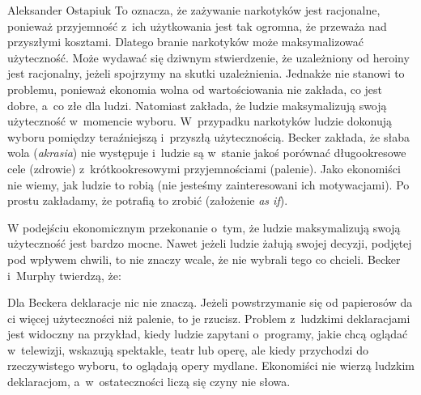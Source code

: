 \begin{artplenv}{Aleksander Ostapiuk}
To oznacza, że zażywanie narkotyków jest racjonalne, ponieważ przyjemność z~ich użytkowania jest tak ogromna, że
przeważa nad przyszłymi kosztami. Dlatego branie narkotyków może maksymalizować użyteczność. Może wydawać się dziwnym
stwierdzenie, że uzależniony od heroiny jest racjonalny, jeżeli spojrzymy na skutki uzależnienia. Jednakże nie stanowi
to problemu, ponieważ ekonomia wolna od wartościowania nie zakłada, co jest dobre, a~co złe dla ludzi. Natomiast
zakłada, że ludzie maksymalizują swoją użyteczność w~momencie wyboru. W~przypadku narkotyków ludzie dokonują wyboru
pomiędzy teraźniejszą i~przyszłą użytecznością. Becker zakłada, że słaba wola (\textit{akrasia}) nie występuje i~ludzie
są w~stanie jakoś porównać długookresowe cele (zdrowie) z~krótkookresowymi przyjemnościami (palenie). Jako ekonomiści
nie wiemy, jak ludzie to robią (nie jesteśmy zainteresowani ich motywacjami). Po prostu zakładamy, że potrafią to
zrobić (założenie \textit{as if}). 

W podejściu ekonomicznym przekonanie o~tym, że ludzie maksymalizują swoją użyteczność jest bardzo mocne. Nawet jeżeli
ludzie żałują swojej decyzji, podjętej pod wpływem chwili, to nie znaczy wcale, że nie wybrali tego co chcieli. Becker
i~Murphy twierdzą, że:


Dla Beckera deklaracje nic nie znaczą. Jeżeli powstrzymanie się od papierosów da ci więcej użyteczności niż palenie, to
je rzucisz. Problem z~ludzkimi deklaracjami jest widoczny na przykład, kiedy ludzie zapytani o~programy, jakie chcą
oglądać w~telewizji, wskazują spektakle, teatr lub operę, ale kiedy przychodzi do rzeczywistego wyboru, to oglądają
opery mydlane. Ekonomiści nie wierzą ludzkim deklaracjom, a~w~ostateczności liczą się czyny nie słowa.


\end{artplenv}

